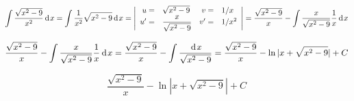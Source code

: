 {}

$$
     \int \dfrac{\sqrt{x^2-9}}{x^2}\hspace{2pt}\text{d}\hspace{1pt}{x}
  =  \int \dfrac{1}{x^2} \sqrt{x^2-9} \hspace{2pt}\text{d}\hspace{1pt}{x}
  =
    \Bigg |
    \begin{array}{rl rl}
      u =& \sqrt{x^2-9}  & v =& 1/x  \\
      u' = & \dfrac{x}{\sqrt{x^2-9}}&  v' = & 1/x^2
      \end{array}
    \Bigg | =  \dfrac{\sqrt{x^2-9}}{x} - \int \dfrac{x}{\sqrt{x^2-9}} \dfrac{1}{x} \hspace{2pt}\text{d}\hspace{1pt}{x}
$$


$$
  \dfrac{\sqrt{x^2-9}}{x} - \int \dfrac{x}{\sqrt{x^2-9}} \dfrac{1}{x} \hspace{2pt}\text{d}\hspace{1pt}{x}
= \dfrac{\sqrt{x^2-9}}{x} - \int \dfrac{\hspace{2pt}\text{d}\hspace{1pt}{x}}{\sqrt{x^2-9}}
= \dfrac{\sqrt{x^2-9}}{x} - \ln{|x+\sqrt{x^2-9}|} + C
$$

$$
  \boxed{\dfrac{\sqrt{x^2-9}}{x} - \ln{|x+\sqrt{x^2-9}|} + C}
$$

